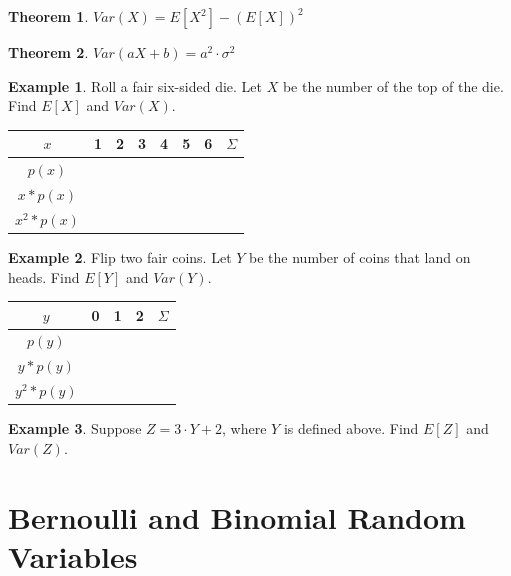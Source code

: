 \documentclass[
  11pt,
  oneside]{book}
\newtheorem{theorem}{Theorem}[chapter]
\theoremstyle{definition}
\theoremstyle{definition}
\newtheorem{example}{Example}[chapter]
\theoremstyle{definition}
\theoremstyle{definition}
\theoremstyle{remark}
\begin{document}
\begin{theorem}
\(Var(X) = E[X^2] - (E[X])^2\)
\end{theorem}

\begin{theorem}
\(Var(aX+b) = a^2 \cdot \sigma^2\)
\end{theorem}

\newpage

\begin{example}
Roll a fair six-sided die. Let \(X\) be the number of the top of the die.
Find \(E[X]\) and \(Var(X)\).
\end{example}

\begin{table}[!h]
\centering
\begin{tabular}{c|c|c|c|c|c|c|c}
\hline
$x$ & 1 & 2 & 3 & 4 & 5 & 6 & $\Sigma$\\
\hline
$p(x)$ &  &  &  &  &  &  & \\
\hline
$x*p(x)$ &  &  &  &  &  &  & \\
\hline
$x^2*p(x)$ &  &  &  &  &  &  & \\
\hline
\end{tabular}
\end{table}

\begin{example}
Flip two fair coins. Let \(Y\) be the number of coins that land on heads. Find \(E[Y]\) and \(Var(Y)\).
\end{example}

\begin{table}[!h]
\centering
\begin{tabular}{c|c|c|c|c}
\hline
$y$ & 0 & 1 & 2 & $\Sigma$\\
\hline
$p(y)$ &  &  &  & \\
\hline
$y*p(y)$ &  &  &  & \\
\hline
$y^2*p(y)$ &  &  &  & \\
\hline
\end{tabular}
\end{table}

\begin{example}
Suppose \(Z = 3 \cdot Y + 2\), where \(Y\) is defined above. Find \(E[Z]\) and \(Var(Z)\).
\end{example}

\newpage

\section{Bernoulli and Binomial Random Variables}\label{bernoulli-and-binomial-random-variables}
\end{document}
